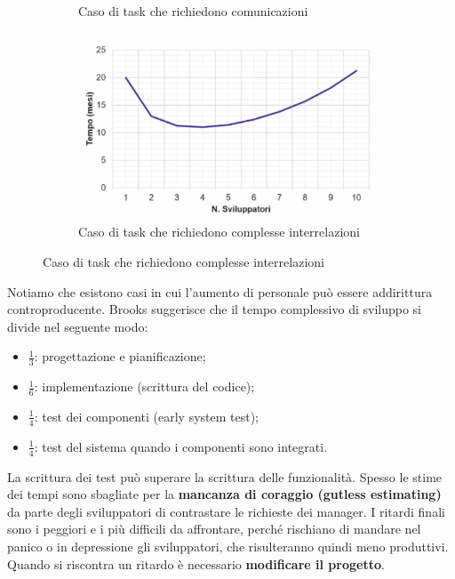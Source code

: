 \begin{figure}[H]
\begin{subfigure}{.24\textwidth}
		\caption{Caso di task che richiedono comunicazioni}
	\end{subfigure}
	\begin{subfigure}{.24\textwidth}
		\centering
		\includegraphics[width=\linewidth]{document/img/nocom.PNG}
		\caption{Caso di task che richiedono complesse interrelazioni}
	\end{subfigure}
\end{figure}
\noindent Notiamo che esistono casi in cui l'aumento di personale può essere addirittura controproducente.\newline\newline
Brooks suggerisce che il tempo complessivo di sviluppo si divide nel seguente modo:
\begin{itemize}
	\item $\frac{1}{3}$: progettazione e pianificazione;
	\item $\frac{1}{6}$: implementazione (scrittura del codice);
	\item $\frac{1}{4}$: test dei componenti (early system test);
	\item $\frac{1}{4}$: test del sistema quando i componenti sono integrati.
\end{itemize}
La scrittura dei test può superare la scrittura delle funzionalità.\newline\newline
Spesso le stime dei tempi sono sbagliate per la \textbf{mancanza di coraggio (gutless estimating)} da parte degli sviluppatori di contrastare le richieste dei manager. I ritardi finali sono i peggiori e i più difficili da affrontare, perché rischiano di mandare nel panico o in depressione gli sviluppatori, che risulteranno quindi meno produttivi.\newline
Quando si riscontra un ritardo è necessario \textbf{modificare il progetto}.\newline
